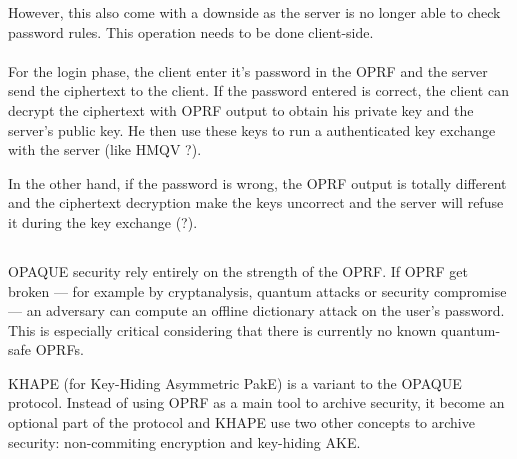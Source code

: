 \documentclass[../report.tex]{subfiles}
\begin{document}
However, this also come with a downside as the server is no longer able to check password rules. This operation needs to be done client-side.


\paragraph{}
For the login phase, the client enter it's password in the OPRF and the server send the ciphertext to the client.
If the password entered is correct, the client can decrypt the ciphertext with OPRF output to obtain his private key and the server's public key.
He then use these keys to run a authenticated key exchange with the server (like HMQV ?).

In the other hand, if the password is wrong, the OPRF output is totally different and the ciphertext decryption make the keys uncorrect and the server will refuse it during the key exchange (?). %






\subsection{}
\paragraph{}

OPAQUE security rely entirely on the strength of the OPRF. If OPRF get broken --- for example by cryptanalysis, quantum attacks or security compromise --- an adversary can compute an offline dictionary attack on the user's password. This is especially critical considering that there is currently no known quantum-safe OPRFs.

KHAPE (for Key-Hiding Asymmetric PakE) \cite{KHAPE_Paper} is a variant to the OPAQUE protocol. Instead of using OPRF as a main tool to archive security, it become an optional part of the protocol and KHAPE use two other concepts to archive security: non-commiting encryption and key-hiding AKE. %

\end{document}
